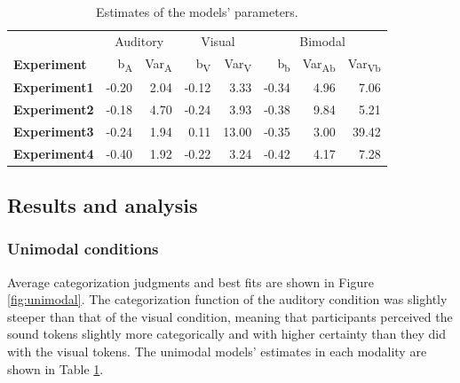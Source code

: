 \documentclass[english,,man,floatsintext]{apa6}
\theoremstyle{definition}
\theoremstyle{definition}
\theoremstyle{definition}
\theoremstyle{remark}
\begin{document}
\begin{table}

\caption{\label{tab:param}Estimates of the models' parameters.}
\centering
\begin{tabular}[t]{>{\bfseries}lrrrrrrr}
\toprule
\multicolumn{1}{c}{} & \multicolumn{2}{c}{Auditory} & \multicolumn{2}{c}{Visual} & \multicolumn{3}{c}{Bimodal} \\
\cmidrule(l{2pt}r{2pt}){2-3} \cmidrule(l{2pt}r{2pt}){4-5} \cmidrule(l{2pt}r{2pt}){6-8}
Experiment & b\textsubscript{A} & Var\textsubscript{A} & b\textsubscript{V} & Var\textsubscript{V} & b\textsubscript{b} & Var\textsubscript{Ab} & Var\textsubscript{Vb}\\
\midrule
Experiment1 & -0.20 & 2.04 & -0.12 & 3.33 & -0.34 & 4.96 & 7.06\\
Experiment2 & -0.18 & 4.70 & -0.24 & 3.93 & -0.38 & 9.84 & 5.21\\
Experiment3 & -0.24 & 1.94 & 0.11 & 13.00 & -0.35 & 3.00 & 39.42\\
Experiment4 & -0.40 & 1.92 & -0.22 & 3.24 & -0.42 & 4.17 & 7.28\\
\bottomrule
\end{tabular}
\end{table}

\subsection{Results and analysis}\label{results-and-analysis}

\subsubsection{Unimodal conditions}\label{unimodal-conditions-1}

Average categorization judgments and best fits are shown in Figure
\ref{fig:unimodal}. The categorization function of the auditory
condition was slightly steeper than that of the visual condition,
meaning that participants perceived the sound tokens slightly more
categorically and with higher certainty than they did with the visual
tokens. The unimodal models' estimates in each modality are shown in
Table \ref{tab:param}.
\end{document}
